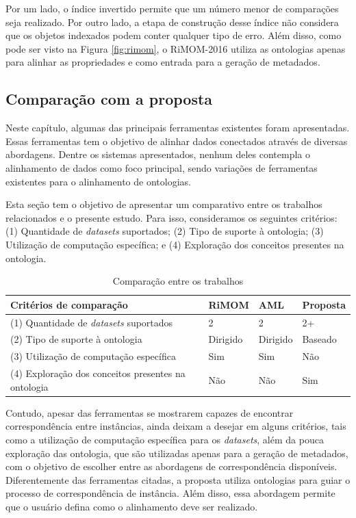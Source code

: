 Por um lado, o índice invertido permite que um número menor de comparações seja realizado. Por outro lado, a etapa de construção desse índice não considera que os objetos indexados podem conter qualquer tipo de erro. Além disso, como pode ser visto na Figura \ref{fig:rimom}, o RiMOM-2016 utiliza as ontologias apenas para alinhar as propriedades e como entrada para a geração de metadados.

\subsection{Comparação com a proposta}

Neste capítulo, algumas das principais ferramentas existentes foram apresentadas. Essas ferramentas tem o objetivo de alinhar dados conectados através de diversas abordagens. Dentre os sistemas apresentados, nenhum deles contempla o alinhamento de dados como foco principal, sendo variações de ferramentas existentes para o alinhamento de ontologias.

Esta seção tem o objetivo de apresentar um comparativo entre os trabalhos relacionados e o presente estudo. Para isso, consideramos os seguintes critérios: (1) Quantidade de \textit{datasets} suportados; (2) Tipo de suporte à ontologia; (3) Utilização de computação específica; e (4) Exploração dos conceitos presentes na ontologia.

\begin{table}[h]
	\centering
	\caption{Comparação entre os trabalhos}
	\label{tab:comparacao}
	\begin{tabular}{@{}llll}
		\toprule
		\textbf{Critérios de comparação}                    & \textbf{RiMOM} & \textbf{AML} & \textbf{Proposta} \\ \midrule
		(1) Quantidade de \textit{datasets} suportados    & 2              & 2            & 2+                \\
		(2) Tipo de suporte à ontologia                     & Dirigido       & Dirigido     & Baseado           \\
		(3) Utilização de computação específica             & Sim            & Sim          & Não               \\
		(4) Exploração dos conceitos presentes na ontologia & Não            & Não          & Sim               \\ \bottomrule
	\end{tabular}
\end{table}

Contudo, apesar das ferramentas se mostrarem capazes de encontrar correspondência entre instâncias, ainda deixam a desejar em alguns critérios, tais como a utilização de computação específica para os \textit{datasets}, além da pouca exploração das ontologia, que são utilizadas apenas para a geração de metadados, com o objetivo de escolher entre as abordagens de correspondência disponíveis. Diferentemente das ferramentas citadas, a proposta utiliza ontologias para guiar o processo de correspondência de instância. Além disso, essa abordagem permite que o usuário defina como o alinhamento deve ser realizado.


